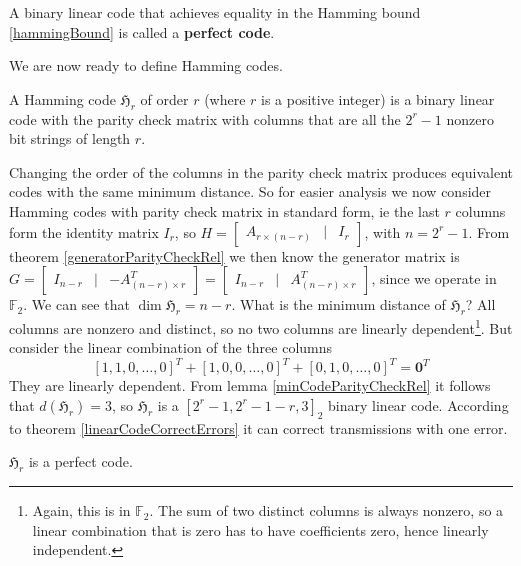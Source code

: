 A binary linear code that achieves equality in the Hamming bound \ref{hammingBound} is called a \textbf{perfect code}.

We are now ready to define Hamming codes.

\begin{defn}\label{hammingCode}
A Hamming code $\mathfrak{H}_r$ of order $r$ (where $r$ is a positive integer) is a binary linear code with the parity check matrix
with columns that are all the $2^r - 1$ nonzero bit strings of length $r$.
\end{defn}

Changing the order of the columns in the parity check matrix produces equivalent codes with the same minimum distance. So for easier analysis we now consider Hamming codes with parity check matrix in standard form, ie the last $r$ columns form the identity matrix $I_r$, so $
H = \left[\begin{smallmatrix}
A_{r \times (n - r)} & | & I_{r}
\end{smallmatrix}\right]
$, with $n = 2^r - 1$. From theorem \ref{generatorParityCheckRel} we then know the generator matrix is $
G = \left[\begin{smallmatrix}
I_{n - r} & | & -A_{(n - r) \times r}^T
\end{smallmatrix}\right] = \left[\begin{smallmatrix}
I_{n - r} & | & A_{(n - r) \times r}^T
\end{smallmatrix}\right]
$, since we operate in $\mathbb{F}_2$. We can see that $\dim \mathfrak{H}_r = n - r$. What is the minimum distance of $\mathfrak{H}_r$? All columns are nonzero and distinct, so no two columns are linearly dependent\footnote{Again, this is in $\mathbb{F}_2$. The sum of two distinct columns is always nonzero, so a linear combination that is zero has to have coefficients zero, hence linearly independent.}. But consider the linear combination of the three columns 
$$
[1, 1, 0, \ldots, 0]^T + [1, 0, 0, \ldots, 0]^T + [0, 1, 0, \ldots, 0]^T = \bm{0}^T
$$
They are linearly dependent. From lemma \ref{minCodeParityCheckRel} it follows that $d(\mathfrak{H}_r) = 3$, so $\mathfrak{H}_r$ is a $[2^r - 1, 2^r - 1 - r, 3]_2$ binary linear code. According to theorem \ref{linearCodeCorrectErrors} it can correct transmissions with one error. 

\begin{thm}\label{hammingPerfect}
$\mathfrak{H}_r$ is a perfect code.
\end{thm}

